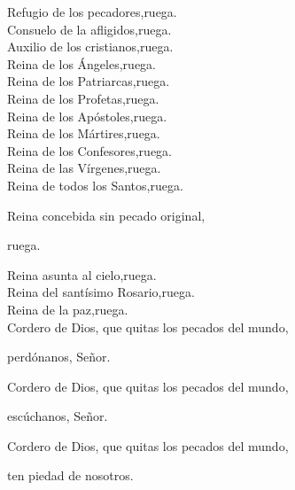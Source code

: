 Refugio de los pecadores,\hfill ruega.\\
Consuelo de la afligidos,\hfill ruega.\\
Auxilio de los cristianos,\hfill ruega.\\
Reina de los Ángeles,\hfill ruega.\\
Reina de los Patriarcas,\hfill ruega.\\
Reina de los Profetas,\hfill ruega.\\
Reina de los Apóstoles,\hfill ruega.\\
Reina de los Mártires,\hfill ruega.\\
Reina de los Confesores,\hfill ruega.\\
Reina de las Vírgenes,\hfill ruega.\\
Reina de todos los Santos,\hfill ruega.

Reina concebida sin pecado original,

\hfill ruega.

Reina asunta al cielo,\hfill ruega.\\
Reina del santísimo Rosario,\hfill ruega.\\
Reina de la paz,\hfill ruega.\\
Cordero de Dios, que quitas los pecados del mundo,

\hfill perdónanos, Señor.

Cordero de Dios, que quitas los pecados del mundo,

\hfill escúchanos, Señor.

Cordero de Dios, que quitas los pecados del mundo,

\hfill ten piedad de nosotros.
